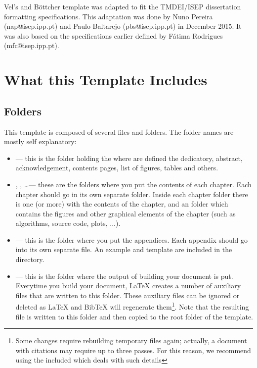 Vel's and Böttcher template was adapted to fit the TMDEI/ISEP dissertation formatting specifications. This adaptation was done by Nuno Pereira (nap@isep.ipp.pt) and Paulo Baltarejo (pbs@isep.ipp.pt) in December 2015. It was also based on the specifications earlier defined by Fátima Rodrigues (mfc@isep.ipp.pt).

\section{What this Template Includes}

\subsection{Folders}

This template is composed of several files and folders. The folder names are mostly self explanatory:

\begin{itemize}
	\item {} --- this is the folder holding the  where are defined the dedicatory, abstract, acknowledgement, contents pages, list of figures, tables and others.

	\item {}, , \ldots --- these are the folders where you put the contents of each chapter. Each chapter should go in its own separate folder. Inside each chapter folder there is one (or more)  with the contents of the chapter, and an  folder which contains the figures and other graphical elements of the chapter (such as algorithms, source code, plots, ...).

	\item {} --- this is the folder where you put the appendices. Each appendix should go into its own separate  file. An example and template are included in the directory.

	\item {} --- this is the folder where the output of building your document is put. Everytime you build your document, \LaTeX{} creates a number of auxiliary files that are written to this folder. These auxiliary files can be ignored or deleted as \LaTeX{} and BibTeX will regenerate them\footnote{Some changes require rebuilding temporary files again; actually, a document with citations may require up to three passes. For this reason, we recommend using the included  which deals with such details}. Note that the resulting  file is written to this folder and then copied to the root folder of the template.
\end{itemize}


